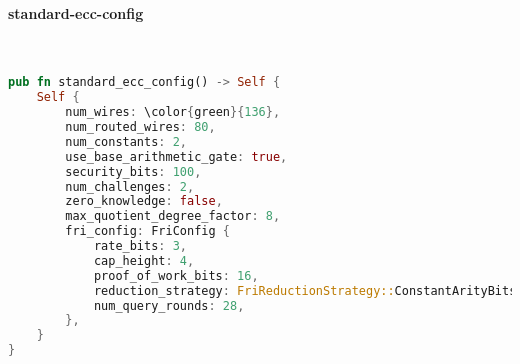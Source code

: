 \paragraph{standard-ecc-config}

\hspace*{\fill} \\
\begin{lstlisting}[language=rust]
pub fn standard_ecc_config() -> Self {
    Self {
        num_wires: \color{green}{136},
        num_routed_wires: 80,
        num_constants: 2,
        use_base_arithmetic_gate: true,
        security_bits: 100,
        num_challenges: 2,
        zero_knowledge: false,
        max_quotient_degree_factor: 8,
        fri_config: FriConfig {
            rate_bits: 3,
            cap_height: 4,
            proof_of_work_bits: 16,
            reduction_strategy: FriReductionStrategy::ConstantArityBits(4, 5),
            num_query_rounds: 28,
        },
    }
}   
\end{lstlisting}
